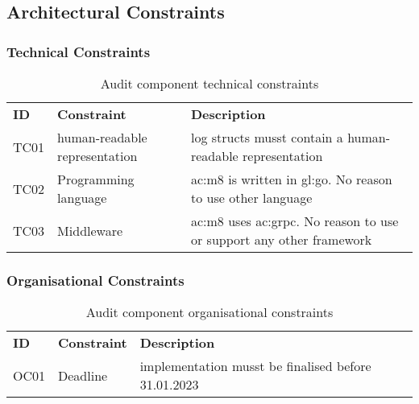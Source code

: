 \subsection{Architectural Constraints}

\subsubsection{Technical Constraints}

\begin{table}[H]
  \begin{center}
    \caption{Audit component technical constraints}
    \label{tab:actc}
    \def\arraystretch{1.5}
    \begin{tabularx}{\linewidth}{|l l X |}
      \hline
      \rowcolor{gray!20}
      \textbf{ID} & \textbf{Constraint} & \textbf{Description}\\
      TC01 & human-readable representation & log structs musst contain a human-readable representation\\
      TC02 & Programming language & \gls{ac:m8} is written in \gls{gl:go}. No reason to use other language\\
      TC03\label{tc:ac03} & Middleware & \gls{ac:m8} uses \gls{ac:grpc}. No reason to use or support any other framework\\
      \hline
    \end{tabularx}
  \end{center}
\end{table}

\subsubsection{Organisational Constraints}

\begin{table}[H]
  \begin{center}
    \caption{Audit component organisational constraints}
    \label{tab:acoc}
    \def\arraystretch{1.5}
    \begin{tabularx}{\linewidth}{|l l X |}
      \hline
      \rowcolor{gray!20}
      \textbf{ID} & \textbf{Constraint} & \textbf{Description}\\
      OC01 & Deadline & implementation musst be finalised before 31.01.2023\\
      \hline
    \end{tabularx}
  \end{center}
\end{table}


